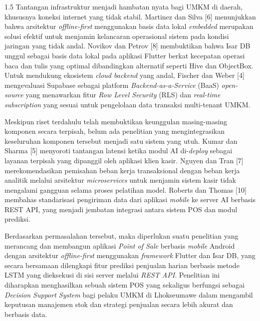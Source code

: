 \documentclass[12pt, a4paper, onecolumn, oneside]{report}
\begin{document}
\begin{spacing}{1.5}
Tantangan infrastruktur menjadi hambatan nyata bagi UMKM di daerah, khususnya koneksi internet yang tidak stabil. Martinez dan Silva [6] menunjukkan bahwa arsitektur \textit{offline-first} menggunakan basis data lokal \textit{embedded} merupakan solusi efektif untuk menjamin kelancaran operasional sistem pada kondisi jaringan yang tidak andal. Novikov dan Petrov [8] membuktikan bahwa Isar DB unggul sebagai basis data lokal pada aplikasi Flutter berkat kecepatan operasi baca dan tulis yang optimal dibandingkan alternatif seperti Hive dan ObjectBox. Untuk mendukung ekosistem \textit{cloud backend} yang andal, Fischer dan Weber [4] mengevaluasi Supabase sebagai platform \textit{Backend-as-a-Service} (BaaS) \textit{open-source} yang menawarkan fitur \textit{Row Level Security} (RLS) dan \textit{real-time subscription} yang sesuai untuk pengelolaan data transaksi multi-tenant UMKM.

Meskipun riset terdahulu telah membuktikan keunggulan masing-masing komponen secara terpisah, belum ada penelitian yang mengintegrasikan keseluruhan komponen tersebut menjadi satu sistem yang utuh. Kumar dan Sharma [5] menyoroti tantangan latensi ketika modul AI di-\textit{deploy} sebagai layanan terpisah yang dipanggil oleh aplikasi klien kasir. Nguyen dan Tran [7] merekomendasikan pemisahan beban kerja transaksional dengan beban kerja analitik melalui arsitektur \textit{microservices} untuk menjamin sistem kasir tidak mengalami gangguan selama proses pelatihan model. Roberts dan Thomas [10] membahas standarisasi pengiriman data dari aplikasi \textit{mobile} ke server AI berbasis REST API, yang menjadi jembatan integrasi antara sistem POS dan modul prediksi.

Berdasarkan permasalahan tersebut, maka diperlukan suatu penelitian yang merancang dan membangun aplikasi \textit{Point of Sale} berbasis \textit{mobile} Android dengan arsitektur \textit{offline-first} menggunakan \textit{framework} Flutter dan Isar DB, yang secara bersamaan dilengkapi fitur prediksi penjualan harian berbasis metode LSTM yang dieksekusi di sisi server melalui \textit{REST API}. Penelitian ini diharapkan menghasilkan sebuah sistem POS yang sekaligus berfungsi sebagai \textit{Decision Support System} bagi pelaku UMKM di Lhokseumawe dalam mengambil keputusan manajemen stok dan strategi penjualan secara lebih akurat dan berbasis data.


\end{spacing}
\end{document}
